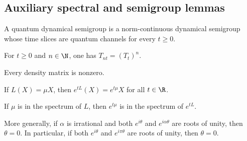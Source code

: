 \subsection{Auxiliary spectral and semigroup lemmas}

\begin{definition}
    \label{def:is_quantum_dyn_semigroup_ch12}
    \leanok
    A quantum dynamical semigroup is a norm-continuous dynamical semigroup whose
    time slices are quantum channels for every $t \ge 0$.
\end{definition}

\begin{theorem}
    \leanok
    For $t\ge 0$ and $n\in\N$, one has $T_{nt}=(T_t)^n$.
\end{theorem}

\begin{lemma}
    \leanok
    Every density matrix is nonzero.
\end{lemma}

\begin{theorem}
    \leanok
    If $L(X)=\mu X$, then $e^{tL}(X)=e^{t\mu}X$ for all $t\in\R$.
\end{theorem}

\begin{theorem}
    \leanok
    If $\mu$ is in the spectrum of $L$, then $e^{t\mu}$ is in the spectrum
    of $e^{tL}$.
\end{theorem}

\begin{theorem}
    \label{thm:root_of_unity_irrational_rescaling_ch12}
    \leanok
    More generally, if $\alpha$ is irrational and both $e^{i\theta}$ and
    $e^{i\alpha\theta}$ are roots of unity, then $\theta=0$.  In particular,
    if both $e^{i\theta}$ and $e^{i\pi\theta}$ are roots of unity, then
    $\theta=0$.
\end{theorem}

